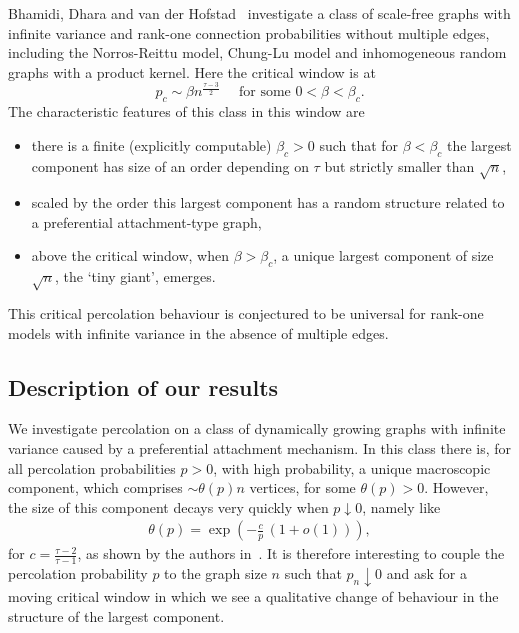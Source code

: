 \documentclass[12pt,a4paper]{article}
\numberwithin{equation}{section}
\begin{document}
Bhamidi, Dhara and  van der Hofstad~\cite{BDH} investigate a class of scale-free graphs with infinite variance and rank-one connection probabilities without multiple edges, including the Norros-Reittu model, Chung-Lu model and inhomogeneous random graphs with a product kernel. Here the critical window is at 
$$p_c\sim \beta n^{\frac{\tau-3}{2}} \quad\text{ for some $0<\beta<\beta_c$.}$$
The characteristic features of this class in this window are
\begin{itemize}
    \item there is a finite  (explicitly computable) $\beta_c>0$ such that for $\beta<\beta_c$ the largest
component has size of an order depending on $\tau$ but strictly smaller than $\sqrt{n}$,
    \item scaled by the order this largest component has a random structure related to a preferential attachment-type graph,
    \item above the critical window, when $\beta>\beta_c$, a unique largest component of size~$\sqrt{n}$, the `tiny giant', emerges.
\end{itemize}
This critical percolation behaviour is conjectured to be universal for rank-one models with infinite variance in the absence of multiple edges.
\smallskip

\pagebreak[3]

\subsection{Description of our results}

We investigate percolation on a class of dynamically growing graphs %
with infinite variance caused by a preferential  attachment mechanism. 
In this class there is, for all percolation probabilities $p>0$, with high probability, a unique macroscopic component, which comprises $\sim\theta(p)n$ vertices, for some $\theta(p)>0$. However, the 
size of this component decays very quickly when $p\downarrow 0$, namely like
	\begin{align}\label{prop:one}
		\theta(p) = 
        \exp\left(-\frac{c}{p} \, (1+o(1))\right),
	\end{align}
for $c=\frac{\tau-2}{\tau-1}$, as shown by the authors in~\cite{waw}. It is therefore interesting to couple the percolation probability $p$ to the graph size $n$ such that $p_n\downarrow0$ and ask for a moving critical window in which we see a qualitative change of behaviour %
in the structure of the largest component. \smallskip
\end{document}
